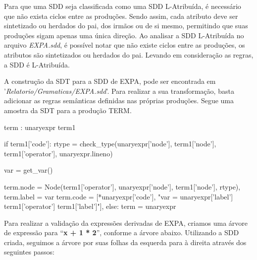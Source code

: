 \documentclass[
	12pt,				%
	openright,			%
	twoside,			%
	a4paper,			%
	english,			%
	french,				%
	spanish,			%
	brazil				%
	]{abntex2}
\begin{document}
Para que uma SDD seja classificada como uma SDD L-Atribuída,
é necessário que não exista ciclos entre as produções.
Sendo assim, cada atributo deve ser sintetizado ou herdados do pai,
dos irmãos ou de si mesmo, permitindo que suas produções sigam apenas uma
única direção. Ao analisar a SDD L-Atribuída no arquivo \emph{EXPA.sdd}, é possível notar
que não existe ciclos entre as produções, os atributos são sintetizados ou herdados do pai.
Levando em consideração as regras, a SDD é L-Atribuída.

A construção da SDT para a SDD de EXPA, pode ser encontrada em '\emph{Relatorio/Gramaticas/EXPA.sdd}'.
Para realizar a sua transformação, basta adicionar as regras semânticas definidas nas próprias produções.
Segue uma amostra da SDT para a produção TERM.

\begin{python}
term : unaryexpr term1 {
if term1['code']:
    rtype = check_type(unaryexpr['node'], term1['node'], term1['operator'], unaryexpr.lineno)

    var = get_var()

    term.node = Node(term1['operator'], unaryexpr['node'], term1['node'], rtype),
    term.label = var
    term.code = [*unaryexpr['code'], "{var} = {unaryexpr['label']} {term1['operator']} {term1['label']}"],
else:
    term = unaryexpr
}
\end{python}
Para realizar a validação da expressões derivadas de EXPA,
criamos uma árvore de expressão para ``\textbf{x + 1 * 2}'', conforme a árvore abaixo.
Utilizando a SDD criada, seguimos a árvore por suas folhas da esquerda para à direita
através dos seguintes passos:
\end{document}
